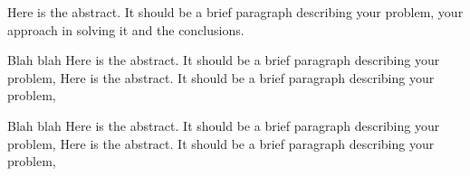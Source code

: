 Here is the abstract. It should be a brief paragraph describing your
problem, your approach in solving it and the conclusions.


Blah blah Here is the abstract. It should be a brief paragraph
describing your problem, Here is the abstract. It should be a brief
paragraph describing your problem,


Blah blah Here is the abstract. It should be a brief paragraph
describing your problem, Here is the abstract. It should be a brief
paragraph describing your problem,
